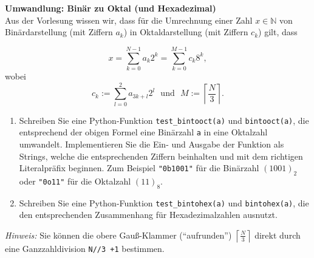 \textbf{Umwandlung: Binär zu Oktal (und Hexadezimal)}\\
Aus der Vorlesung wissen wir, dass für die Umrechnung einer Zahl $x \in \mathbb{N}$ von Binärdarstellung
(mit Ziffern $a_k$) in Oktaldarstellung (mit Ziffern $c_k$) gilt, dass

$$
x = \sum_{k=0}^{N-1} a_k 2^k = \sum_{k=0}^{M-1} c_k 8^k,
$$
wobei
$$
c_k := \sum_{l=0}^{2} a_{3k+l}2^l ~~~\text{und}~~~M := \left\lceil{\frac{N}{3}} \right\rceil.
$$



\begin{enumerate}
	\item Schreiben Sie eine Python-Funktion \verb|test_bintooct(a)| und \verb|bintooct(a)|, die entsprechend der obigen Formel
	eine Binärzahl \texttt{a} in eine Oktalzahl umwandelt. Implementieren Sie die Ein- und Ausgabe der Funktion als Strings, welche die entsprechenden Ziffern beinhalten und mit dem richtigen Literalpräfix beginnen. Zum Beispiel \texttt{"0b1001"} für die Binärzahl $(1001)_2$ oder \texttt{"0o11"} für die Oktalzahl $(11)_8$.
	\item Schreiben Sie eine Python-Funktion  \verb|test_bintohex(a)| und \verb|bintohex(a)|, die den entsprechenden Zusammenhang für Hexadezimalzahlen ausnutzt.
\end{enumerate}
\textit{Hinweis:} Sie können die obere Gauß-Klammer (``aufrunden'') $\left\lceil{\frac{N}{3}} \right\rceil$ direkt durch eine Ganzzahldivision \verb|N//3 +1| bestimmen.